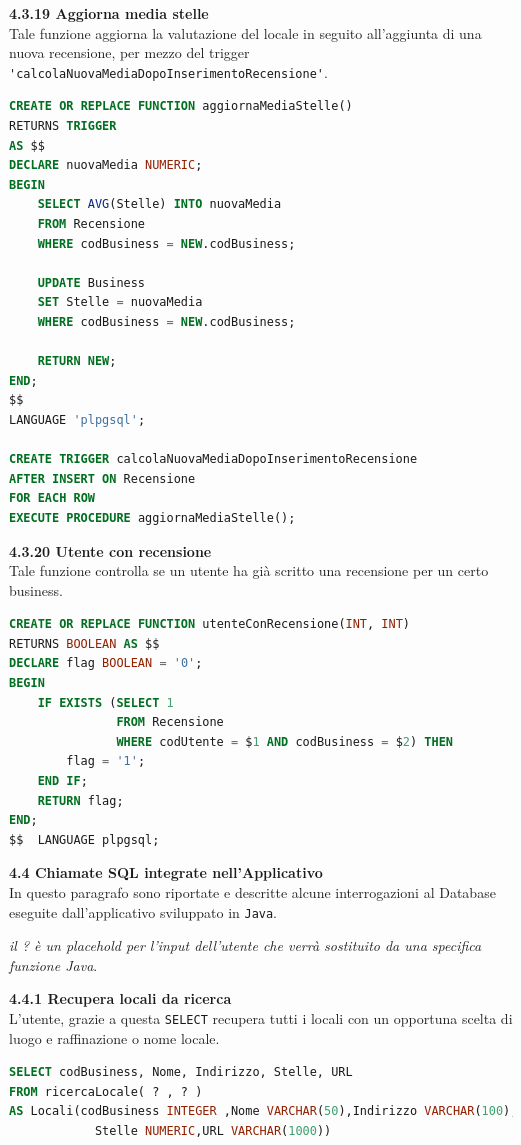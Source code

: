 \documentclass[a4paper,12pt]{article}
\begin{document}
\newpage\null{}\setcounter{page}{26}
\vspace{-2cm}
{\flushleft \bf 4.3.19  Aggiorna media stelle}\\
Tale funzione aggiorna la valutazione del locale in seguito all'aggiunta di una
nuova recensione, per mezzo del trigger \verb|'calcolaNuovaMediaDopoInserimentoRecensione'|.
\begin{lstlisting}[language=SQL]
CREATE OR REPLACE FUNCTION aggiornaMediaStelle()
RETURNS TRIGGER
AS $$
DECLARE nuovaMedia NUMERIC;
BEGIN
    SELECT AVG(Stelle) INTO nuovaMedia
    FROM Recensione
    WHERE codBusiness = NEW.codBusiness;

    UPDATE Business
    SET Stelle = nuovaMedia
    WHERE codBusiness = NEW.codBusiness;

    RETURN NEW;
END;
$$
LANGUAGE 'plpgsql';

CREATE TRIGGER calcolaNuovaMediaDopoInserimentoRecensione
AFTER INSERT ON Recensione
FOR EACH ROW
EXECUTE PROCEDURE aggiornaMediaStelle();
\end{lstlisting}

\vspace*{+1cm}

{\flushleft \bf 4.3.20  Utente con recensione}\\
Tale funzione controlla se un utente ha già scritto una recensione per un certo
business.
\begin{lstlisting}[language=SQL]
CREATE OR REPLACE FUNCTION utenteConRecensione(INT, INT)
RETURNS BOOLEAN AS $$
DECLARE flag BOOLEAN = '0';
BEGIN
	IF EXISTS (SELECT 1 
			   FROM Recensione 
			   WHERE codUtente = $1 AND codBusiness = $2) THEN
		flag = '1';
	END IF;
	RETURN flag;
END;
$$  LANGUAGE plpgsql;
\end{lstlisting}

\newpage\null{}\setcounter{page}{27}
\vspace{-2cm}
{\flushleft \bf 4.4  Chiamate SQL integrate nell'Applicativo}\\
In questo paragrafo sono riportate e descritte alcune 
interrogazioni al Database eseguite dall'applicativo sviluppato in \verb|Java|.

\begin{center}
{\small \it* il ? è un placehold per l'input dell'utente che verrà sostituito da una specifica funzione Java}.
\end{center}

{\flushleft \bf 4.4.1  Recupera locali da ricerca}\\
\normalsize{L'utente, grazie a questa \verb|SELECT| recupera tutti i locali con un opportuna scelta di luogo e raffinazione o nome locale.}
\begin{lstlisting}[language=SQL]
SELECT codBusiness, Nome, Indirizzo, Stelle, URL
FROM ricercaLocale( ? , ? )
AS Locali(codBusiness INTEGER ,Nome VARCHAR(50),Indirizzo VARCHAR(100),
	        Stelle NUMERIC,URL VARCHAR(1000))
\end{lstlisting}
\end{document}
